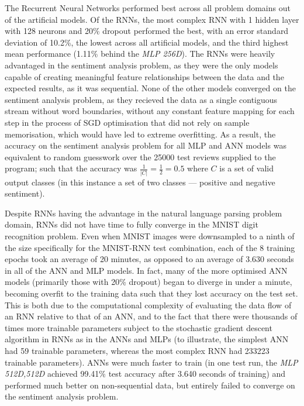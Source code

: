 \documentclass[]{report}
\begin{document}
The Recurrent Neural Networks performed best across all problem domains out of the artificial models. Of the RNNs, the most complex RNN with 1 hidden layer with 128 neurons and 20\% dropout performed the best, with an error standard deviation of 10.2\%, the lowest across all artificial models, and the third highest mean performance (1.11\% behind the \emph{MLP 256D}). The RNNs were heavily advantaged in the sentiment analysis problem, as they were the only models capable of creating meaningful feature relationships between the data and the expected results, as it was sequential. None of the other models converged on the sentiment analysis problem, as they recieved the data as a single contiguous stream without word boundaries, without any constant feature mapping for each step in the process of SGD optimisation that did not rely on sample memorisation, which would have led to extreme overfitting. As a result, the accuracy on the sentiment analysis problem for all MLP and ANN models was equivalent to random guesswork over the 25000 test reviews supplied to the program; such that the accuracy was $\frac{1}{|C|} = \frac{1}{2} = 0.5$ where $C$ is a set of valid output classes (in this instance a set of two classes --- positive and negative sentiment).

Despite RNNs having the advantage in the natural language parsing problem domain, RNNs did not have time to fully converge in the MNIST digit recognition problem. Even when MNIST images were downsampled to a ninth of the size specifically for the MNIST-RNN test combination, each of the 8 training epochs took an average of 20 minutes, as opposed to an average of 3.630 seconds in all of the ANN and MLP models. In fact, many of the more optimised ANN models (primarily those with 20\% dropout) began to diverge in under a minute, becoming overfit to the training data such that they lost accuracy on the test set. This is both due to the computational complexity of evaluating the data flow of an RNN relative to that of an ANN, and to the fact that there were thousands of times more trainable parameters subject to the stochastic gradient descent algorithm in RNNs as in the ANNs and MLPs (to illustrate, the simplest ANN had 59 trainable parameters, whereas the most complex RNN had 233223 trainable parameters). ANNs were much faster to train (in one test run, the \emph{MLP 512D,512D} achieved 99.41\% test accuracy after 3.640 seconds of training) and performed much better on non-sequential data, but entirely failed to converge on the sentiment analysis problem.
\end{document}
